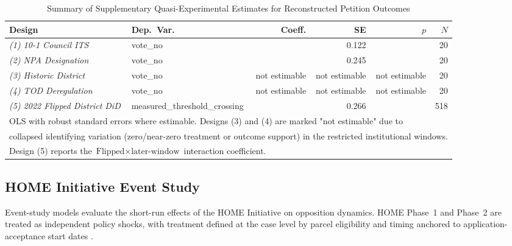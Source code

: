 \documentclass[11pt, letterpaper]{article}
\begin{document}
\begin{table}[H]
\centering
\caption{Summary of Supplementary Quasi-Experimental Estimates for Reconstructed Petition Outcomes}
\label{tab:geographic_causal}
\small
\begin{tabular}{@{}llrrrr@{}}
\toprule
\textbf{Design} & \textbf{Dep.\ Var.} & \textbf{Coeff.} & \textbf{SE} & \textbf{$p$} & \textbf{$N$} \\
\midrule
\textit{(1) 10-1 Council ITS}       & vote\_no       & \metricTenOneITSCoeff{}   & 0.122  & \metricTenOneITSPval{}  & 20 \\
\textit{(2) NPA Designation}   & vote\_no       & \metricNPAFrictionCoeff{} & 0.245  & \metricNPAFrictionPval{}& 20 \\
\textit{(3) Historic District}      & vote\_no       & not estimable  & not estimable    & not estimable & 20 \\
\textit{(4) TOD Deregulation}       & vote\_no       & not estimable & not estimable    & not estimable& 20 \\
\textit{(5) 2022 Flipped District DiD}& measured\_threshold\_crossing    & \textbf{\metricFlipDiDCoeff{}}     & 0.266  & \textbf{\metricFlipDiDPval{}}    & 518 \\
\bottomrule
\multicolumn{6}{l}{\footnotesize OLS with robust standard errors where estimable. Designs (3) and (4) are marked "not estimable" due to}\\
\multicolumn{6}{l}{\footnotesize collapsed identifying variation (zero/near-zero treatment or outcome support) in the restricted institutional windows.} \\
\multicolumn{6}{l}{\footnotesize Design (5) reports the $\text{Flipped} \times \text{later-window}$ interaction coefficient.} \\
\end{tabular}
\end{table}


\newpage
\subsection{HOME Initiative Event Study}
\label{app:home}

\noindent Event-study models evaluate the short-run effects of the HOME Initiative on opposition dynamics. HOME Phase~1 and Phase~2 are treated as independent policy shocks, with treatment defined at the case level by parcel eligibility and timing anchored to application-acceptance start dates \cite{pool2023,callaway2021did}.
\end{document}
